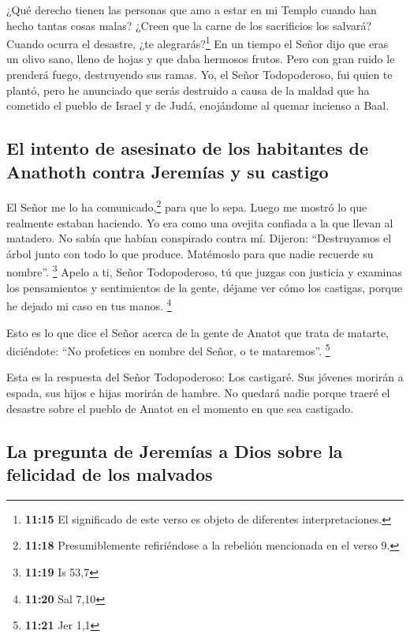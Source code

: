  ¿Qué derecho tienen las personas que amo a estar en mi
Templo cuando han hecho tantas cosas malas? ¿Creen que la carne de los
sacrificios los salvará? Cuando ocurra el desastre, ¿te
alegrarás?\footnote{\textbf{11:15} El significado de este verso es
  objeto de diferentes interpretaciones.}  En un tiempo
el Señor dijo que eras un olivo sano, lleno de hojas y que daba hermosos
frutos. Pero con gran ruido le prenderá fuego, destruyendo sus ramas.
 Yo, el Señor Todopoderoso, fui quien te plantó, pero he
anunciado que serás destruido a causa de la maldad que ha cometido el
pueblo de Israel y de Judá, enojándome al quemar incienso a Baal.

\hypertarget{el-intento-de-asesinato-de-los-habitantes-de-anathoth-contra-jeremuxedas-y-su-castigo}{%
\subsection{El intento de asesinato de los habitantes de Anathoth contra
Jeremías y su
castigo}\label{el-intento-de-asesinato-de-los-habitantes-de-anathoth-contra-jeremuxedas-y-su-castigo}}

 El Señor me lo ha comunicado,\footnote{\textbf{11:18}
  Presumiblemente refiriéndose a la rebelión mencionada en el verso 9.}
para que lo sepa. Luego me mostró lo que realmente estaban haciendo.
 Yo era como una ovejita confiada a la que llevan al
matadero. No sabía que habían conspirado contra mí. Dijeron:
``Destruyamos el árbol junto con todo lo que produce. Matémoslo para que
nadie recuerde su nombre''. \footnote{\textbf{11:19} Is 53,7}
 Apelo a ti, Señor Todopoderoso, tú que juzgas con
justicia y examinas los pensamientos y sentimientos de la gente, déjame
ver cómo los castigas, porque he dejado mi caso en tus manos.
\footnote{\textbf{11:20} Sal 7,10}

 Esto es lo que dice el Señor acerca de la gente de
Anatot que trata de matarte, diciéndote: ``No profetices en nombre del
Señor, o te mataremos''. \footnote{\textbf{11:21} Jer 1,1}

 Esta es la respuesta del Señor Todopoderoso: Los
castigaré. Sus jóvenes morirán a espada, sus hijos e hijas morirán de
hambre.  No quedará nadie porque traeré el desastre sobre
el pueblo de Anatot en el momento en que sea castigado.

\hypertarget{la-pregunta-de-jeremuxedas-a-dios-sobre-la-felicidad-de-los-malvados}{%
\subsection{La pregunta de Jeremías a Dios sobre la felicidad de los
malvados}\label{la-pregunta-de-jeremuxedas-a-dios-sobre-la-felicidad-de-los-malvados}}

